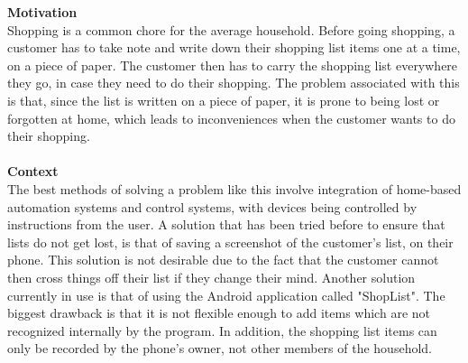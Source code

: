 {\textbf{Motivation} \\
Shopping is a common chore for the average household\cite{Block:Shopping}. Before going shopping, a customer has to take note and write down their shopping list items one at a time, on a piece of paper. The customer then has to carry the shopping list everywhere they go, in case they need to do their shopping. The problem associated with this is that, since the list is written on a piece of paper, it is prone to being lost or forgotten at home, which leads to inconveniences when the customer wants to do their shopping. %
\noindent
\\\\
\textbf{Context} \\
The best methods of solving a problem like this involve integration of home-based automation systems and control systems\cite{Kuo:Automatic_Control_Systems}, with devices being controlled by instructions from the user\cite{Yuksekkaya:Automation_Systems}.
A solution that has been tried before to ensure that lists do not get lost, is that of saving a screenshot of the customer's list, on their phone\cite{WinNT}. This solution is not desirable due to the fact that the customer cannot then cross things off their list if they change their mind. Another solution currently in use is that of using the Android application called "ShopList"\cite{ShopL}. The biggest drawback is that it is not flexible enough to add items which are not recognized internally by the program. In addition, the shopping list items can only be recorded by the phone's owner, not other members of the household.\\
}
